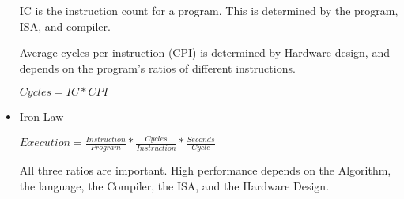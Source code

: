 \documentclass{report}
\begin{document}
\begin{mdframed}
\begin{itemize}
            IC is the instruction count for a program. This is
            determined by the program, ISA, and compiler.

            Average cycles per instruction (CPI) is
            determined by Hardware design, and depends
            on the program's ratios of different instructions.

            $Cycles = IC * CPI$

        \item Iron Law

            $Execution = \frac{Instruction}{Program} 
            * \frac{Cycles}{Instruction} * \frac{Seconds}{Cycle}$

            All three ratios are important.
            High performance depends on the Algorithm,
            the language, the Compiler, the ISA,
            and the Hardware Design.
    \end{itemize}
\end{mdframed}
\end{document}
